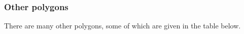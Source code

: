             \subsubsection{ Other polygons}
            \nopagebreak
        \label{m39368*id319439}There are many other polygons, some of which are given in the table below.\par 
    \setlength\mytablespace{4\tabcolsep}
    \addtolength\mytablespace{3\arrayrulewidth}
    \setlength\mytablewidth{\linewidth}
    \setlength\mytableroom{\mytablewidth}
    \addtolength\mytableroom{-\mytablespace}
    \setlength\myfixedwidth{0pt}
    \setlength\mystarwidth{\mytableroom}
        \addtolength\mystarwidth{-\myfixedwidth}
        \divide{}
